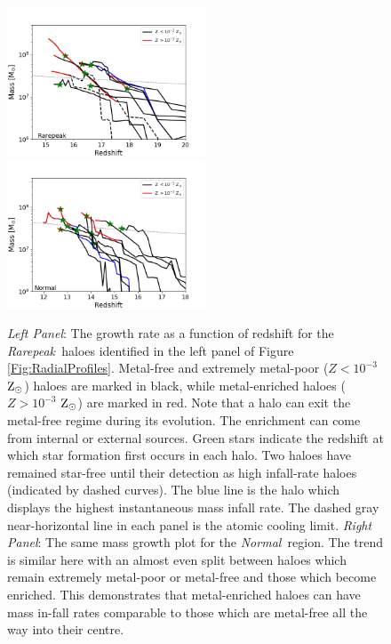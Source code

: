 \documentclass[graphics, twocolumn, usenatbib]{mn2e}
\newcommand{\zsolarc} {$\rm{Z_{\odot}}$}
\newcommand{\rarepeak} {\textit{Rarepeak~}}
\newcommand{\normal} {\textit{Normal~}}
\begin{document}
\begin{figure} 
\centering
\begin{minipage}{175mm}      \begin{center} 
\centerline{
\includegraphics[width=0.525\textwidth]{FIGURES/Rarepeak_MassRedshift.png}
\includegraphics[width=0.525\textwidth]{FIGURES/Normal_MassRedshift.png}}
\caption{\textit{Left Panel}: The growth rate as a function of redshift for the \rarepeak haloes
  identified in the left
  panel of Figure \ref{Fig:RadialProfiles}. Metal-free and extremely metal-poor ($Z < 10^{-3}$
  \zsolarc) haloes are marked in black, while metal-enriched haloes ($Z > 10^{-3}$ \zsolarc) are
  marked in red. Note that a halo can exit the metal-free regime during its evolution. The
  enrichment can come from internal or external sources. Green stars indicate the redshift at
  which star formation first occurs in each halo. Two haloes have remained star-free until their
  detection as high infall-rate haloes (indicated by dashed curves). The blue line is the halo which displays the
  highest instantaneous mass infall rate. 
  The dashed gray near-horizontal line in each panel is the atomic cooling limit.
  \textit{Right Panel}: The same mass growth plot for the \normal region. The trend is similar
  here with an almost even split between haloes which remain extremely metal-poor or metal-free and
  those which become enriched. This demonstrates that metal-enriched haloes can have
  mass in-fall rates comparable to those which are metal-free all the way into their centre. 
}\label{Fig:GrowthRates}
\end{center} \end{minipage}

\end{figure}
\end{document}
